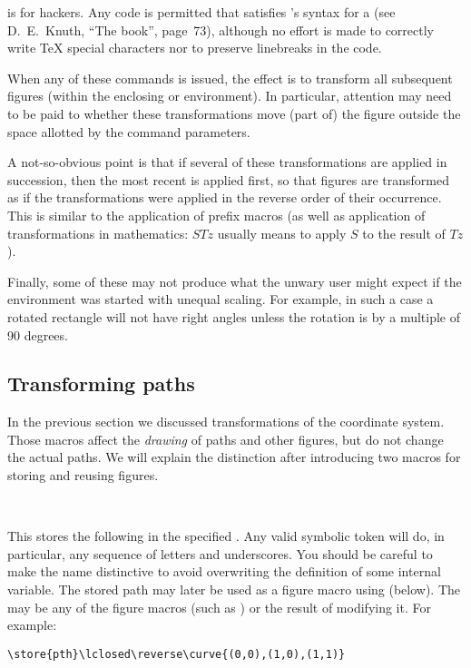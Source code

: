 \documentclass[letterpaper]{article}
\begin{document}
 is for \MF{} hackers. Any code is permitted that satisfies
\MF{}'s syntax for a  (see D.~E.~Knuth, ``The
\MF{}book'', page~73), although no effort is made to correctly write
\TeX{} special characters nor to preserve linebreaks in the code.

When any of these commands is issued, the effect is to transform all
subsequent figures (within the enclosing  or 
environment). In particular, attention may need to be paid to whether
these transformations move (part of) the figure outside the space
allotted by the  command parameters.

A not-so-obvious point is that if several of these transformations are
applied in succession, then the most recent is applied first, so that
figures are transformed as if the transformations were applied in the
reverse order of their occurrence. This is similar to the application of
prefix macros (as well as application of transformations in mathematics:
$S T z$ usually means to apply $S$ to the result of $T z$).

Finally, some of these may not produce what the unwary user might expect
if the  environment was started with unequal scaling. For
example, in such a case a rotated rectangle will not have right angles
unless the rotation is by a multiple of 90 degrees.


\subsection{Transforming paths}\label{transformation}

In the previous section we discussed transformations of the \MF{}
coordinate system. Those macros affect the \emph{drawing} of paths and
other figures, but do not change the actual paths. We will explain the
distinction after introducing two macros for storing and reusing
figures.

\begin{cd}
\\
%
\end{cd}

This stores the following  in the specified \MF{} . Any valid \MF{} symbolic token will do, in particular, any
sequence of letters and underscores. You should be careful to make the
name distinctive to avoid overwriting the definition of some internal
variable. The stored path may later be used as a figure macro
using  (below). The  may be any of the figure
macros (such as ) or the result of
modifying it. For example:
\begin{verbatim}
\store{pth}\lclosed\reverse\curve{(0,0),(1,0),(1,1)}
\end{verbatim}
\end{document}
